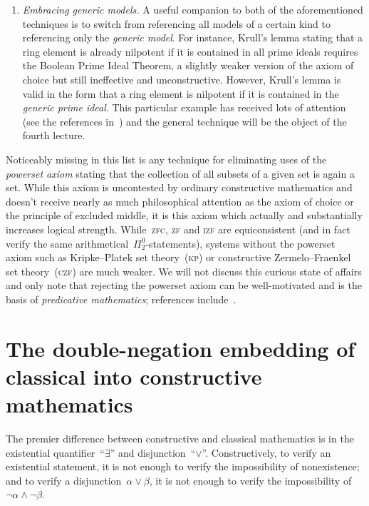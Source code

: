 \documentclass[10pt,reqno,a4paper,openany]{amsbook}
\theoremstyle{definition}
\theoremstyle{plain}
\theoremstyle{remark}
\newcommand{\?}{\,{:}\,}
\renewcommand{\_}{\mathpunct{.}\,}
\begin{document}
\begin{enumerate}
\item \emph{Embracing generic models.} A useful companion to both of the
aforementioned techniques is to switch from referencing all models of a certain
kind to referencing only the \emph{generic model}. For instance, Krull's lemma
stating that a ring element is already nilpotent if it is contained in all
prime ideals requires the Boolean Prime Ideal Theorem, a slightly weaker
version of the axiom of choice but still ineffective and unconstructive.
However, Krull's lemma is valid in the form that a ring element is nilpotent if
it is contained in the \emph{generic prime ideal}. This particular example has
received lots of attention (see the references
in~\cite{blechschmidt-schuster:constructive-maximal-ideals}) and the general
technique will be the object of the fourth lecture.
\end{enumerate}

Noticeably missing in this list is any technique for eliminating uses of the
\emph{powerset axiom} stating that the collection of all subsets of a given
set is again a set. While this axiom is uncontested by ordinary constructive
mathematics and doesn't receive nearly as much philosophical attention as the
axiom of choice or the principle of excluded middle, it is this axiom which actually
and substantially increases logical strength. While~\textsc{zfc}, \textsc{zf}
and \textsc{izf} are equiconsistent (and in fact verify the same
arithmetical~$\Pi^0_2$-statements), systems without the powerset axiom such as Kripke--Platek
set theory~(\textsc{kp}) or constructive Zermelo--Fraenkel set
theory~(\textsc{czf}) are much weaker. We will not discuss this curious state
of affairs and only note that rejecting the powerset axiom can be
well-motivated and is the basis of \emph{predicative mathematics};
references include~\cite{crosilla:predicativity,aczel-rathjen:cst}.


\section{The double-negation embedding of classical into constructive mathematics}

The premier difference between constructive and classical mathematics is in the
existential quantifier~``$\exists$'' and disjunction~``$\vee$''.
Constructively, to verify an existential statement, it is not enough to verify
the impossibility of nonexistence; and to verify a disjunction~$\alpha \vee
\beta$, it is not enough to verify the impossibility of~$\neg\alpha \wedge
\neg\beta$.
\end{document}
